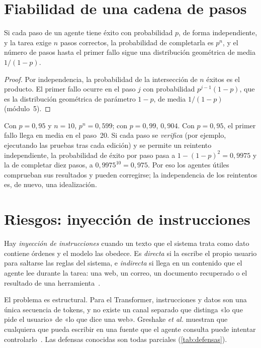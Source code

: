 \section{Fiabilidad de una cadena de pasos}

\begin{proposicion}\label{prop:fiabilidad}
Si cada paso de un agente tiene éxito con probabilidad $p$, de forma independiente, y la tarea exige $n$ pasos correctos, la probabilidad de completarla es $p^{n}$, y el número de pasos hasta el primer fallo sigue una distribución geométrica de media $1/(1-p)$.
\end{proposicion}

\begin{proof}
Por independencia, la probabilidad de la intersección de $n$ éxitos es el producto. El primer fallo ocurre en el paso $j$ con probabilidad $p^{j-1}(1-p)$, que es la distribución geométrica de parámetro $1-p$, de media $1/(1-p)$ (módulo~5).
\end{proof}

Con $p=0{,}95$ y $n=10$, $p^{n}=0{,}599$; con $p=0{,}99$, $0{,}904$. Con $p=0{,}95$, el primer fallo llega en media en el paso~20. Si cada paso se \emph{verifica} (por ejemplo, ejecutando las pruebas tras cada edición) y se permite un reintento independiente, la probabilidad de éxito por paso pasa a $1-(1-p)^{2}=0{,}9975$ y la de completar diez pasos, a $0{,}9975^{10}=0{,}975$. Por eso los agentes útiles comprueban sus resultados y pueden corregirse; la independencia de los reintentos es, de nuevo, una idealización.

\section{Riesgos: inyección de instrucciones}

\begin{definicion}\label{def:inyeccion}
Hay \emph{inyección de instrucciones} cuando un texto que el sistema trata como dato contiene órdenes y el modelo las obedece. Es \emph{directa} si la escribe el propio usuario para saltarse las reglas del sistema, e \emph{indirecta} si llega en un contenido que el agente lee durante la tarea: una web, un correo, un documento recuperado o el resultado de una herramienta~\cite{greshake}.
\end{definicion}

El problema es estructural. Para el Transformer, instrucciones y datos son una única secuencia de tokens, y no existe un canal separado que distinga «lo que pide el usuario» de «lo que dice una web». Greshake \emph{et al.} muestran que cualquiera que pueda escribir en una fuente que el agente consulta puede intentar controlarlo~\cite{greshake}. Las defensas conocidas son todas parciales (\cref{tab:defensas}).

